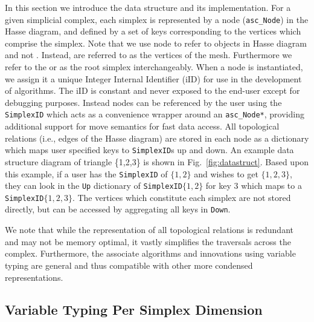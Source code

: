 \par In this section we introduce the \asc data structure and its implementation.
For a given simplicial complex, each simplex is represented by a node (\verb|asc_Node|) in the Hasse diagram, and defined by a set of keys corresponding to the vertices which comprise the simplex.
Note that we use node to refer to objects in \asc Hasse diagram and not . Instead,  are referred to as the vertices of the mesh.
Furthermore we refer to the \simplex{\varnothing} or  as the root simplex interchangeably.
When a node is instantiated, we assign it a unique Integer Internal Identifier (iID) for use in the development of \asc algorithms.
The iID is constant and never exposed to the end-user except for debugging purposes.
Instead nodes can be referenced by the user using the \verb|SimplexID| which acts as a convenience wrapper around an \verb|asc_Node*|, providing additional support for move semantics for fast data access.
All topological relations (i.e., edges of the Hasse diagram) are stored in each node as a dictionary which maps user specified keys to \verb|SimplexID|s up and down.
An example data structure diagram of triangle \{1,2,3\} is shown in Fig.~\ref{fig:datastruct}.
Based upon this example, if a user has the \verb|SimplexID| of  $\{1,2\}$ and wishes to get  $\{1,2,3\}$, they can look in the \verb|Up| dictionary of \verb|SimplexID|$\{1,2\}$ for key $3$ which maps to a \verb|SimplexID|$\{1,2,3\}$.
The vertices which constitute each simplex are not stored directly, but can be accessed by aggregating all keys in \verb|Down|.

\par We note that while the representation of all topological relations is redundant and may not be memory optimal, it vastly simplifies the traversals across the complex.
Furthermore, the associate algorithms and innovations using variable typing are general and thus compatible with other more condensed representations.

\subsection{Variable Typing Per Simplex Dimension}

